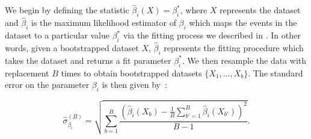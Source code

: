 We begin by defining the statistic $\hat{\beta}_i(X) = \beta_i^*$, where $X$ represents the dataset and $\hat{\beta}_i$ is the maximum likelihood estimator of $\beta_i$ which maps the events in the dataset to a particular value $\beta_i^*$ via the fitting process we described in . In other words, given a bootstrapped dataset $X$, $\hat{\beta}_i$ represents the fitting procedure which takes the dataset and returns a fit parameter $\beta^*_i$. We then resample the data with replacement $B$ times to obtain bootstrapped datasets $\{X_1,\ldots,X_b\}$. The standard error on the parameter $\beta_i$ is then given by~\cite{Efron1981}:

\begin{equation}
  \hat{\sigma}_{\beta_i}^{(B)} = \sqrt{\sum_{b=1}^{B}\frac{\left(\hat{\beta}_i(X_b) - \frac{1}{B}\sum_{b'=1}^{B} \hat{\beta}_i(X_{b'}) \right)^2}{B-1}}.
  \label{eq:bootstrap-standard-error}
\end{equation}

